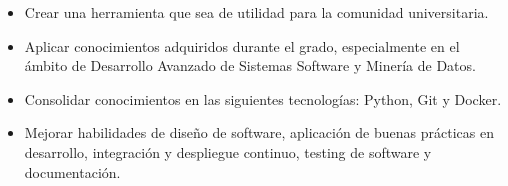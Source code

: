 \begin{itemize}
    \item Crear una herramienta que sea de utilidad para la comunidad universitaria.

    \item Aplicar conocimientos adquiridos durante el grado, especialmente en el ámbito
          de Desarrollo Avanzado de Sistemas Software y Minería de Datos.

    \item Consolidar conocimientos en las siguientes tecnologías: Python, Git y Docker.

    \item Mejorar habilidades de diseño de software, aplicación de buenas prácticas en
          desarrollo, integración y despliegue continuo, testing de software y
          documentación.
\end{itemize}


